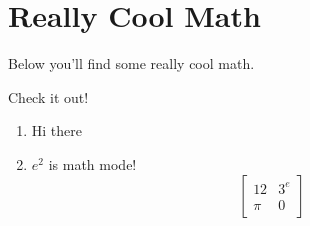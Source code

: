 \section*{Really Cool Math}\label{really-cool-math}

Below you'll find some really cool math.

Check it out!

\begin{enumerate}
\item
  Hi there
\item
  \(e^2\) is math mode! \[\begin{bmatrix}12&3^e\\\pi&0\end{bmatrix}\]
\end{enumerate}
